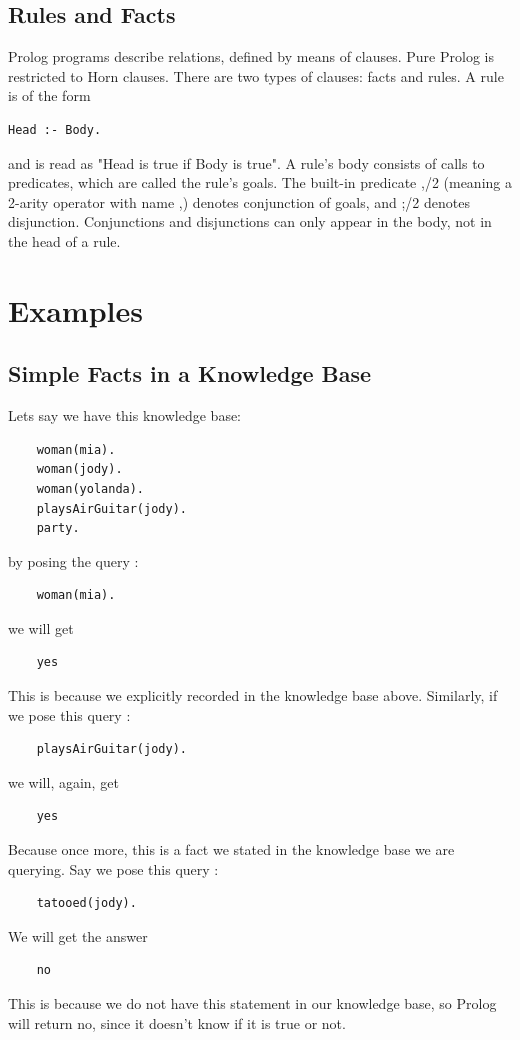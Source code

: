 \documentclass[14pt]{article}
\begin{document}
\subsection{Rules and Facts}
Prolog programs describe relations, defined by means of clauses.
Pure Prolog is restricted to Horn clauses.
There are two types of clauses: facts and rules. A rule is of the form
\begin{verbatim}Head :- Body.\end{verbatim}
and is read as "Head is true if Body is true". A rule's body consists 
of calls to predicates, which are called the rule's goals.
The built-in predicate ,/2 (meaning a 2-arity operator with name ,)
denotes conjunction of goals, and ;/2 denotes disjunction.
Conjunctions and disjunctions can only appear in the body,
not in the head of a rule.

\newpage
\section{Examples}
\subsection{Simple Facts in a Knowledge Base}
Lets say we have this knowledge base:
\begin{verbatim}
	woman(mia).
	woman(jody).
	woman(yolanda).
	playsAirGuitar(jody).
	party.
\end{verbatim}
by posing the query :
\begin{verbatim}
	woman(mia).
\end{verbatim}
we will get
\begin{verbatim}	yes\end{verbatim}
This is because we explicitly recorded in the knowledge base above.
Similarly, if we pose this query :
\begin{verbatim}
	playsAirGuitar(jody).
\end{verbatim} 
we will, again, get
\begin{verbatim}	yes\end{verbatim}
Because once more, this is a fact we stated in the knowledge base we are 
querying. Say we pose this query :
\begin{verbatim}
	tatooed(jody).
\end{verbatim}
We will get the answer
\begin{verbatim}	no\end{verbatim}
This is 
because we do not have this statement in our knowledge base, so Prolog
will return no, since it doesn't know if it is true or not.
\newpage 
\end{document}
